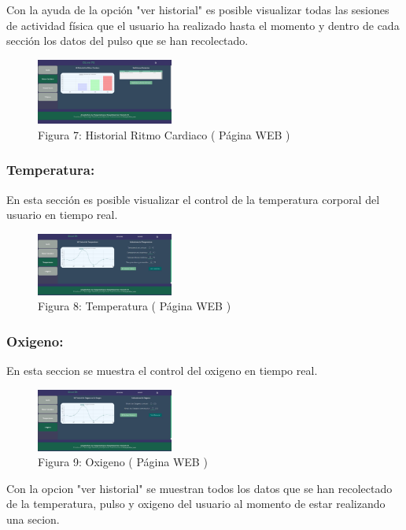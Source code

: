\documentclass[osajnl,twocolumn,showpacs,superscriptaddress,10pt]{revtex4-1}
\begin{document}
    Con la ayuda de la opción "ver historial" es posible visualizar todas las sesiones de actividad física que el usuario ha realizado hasta el momento y dentro de cada sección los datos del pulso que se han recolectado.
    
\begin{figure} [H] \centering 
\caption{Figura 7: Historial Ritmo Cardiaco ( Página WEB )}
\includegraphics[width=0.4\textwidth]{RitmoCh.PNG}
\end{figure}

\subsubsection{Temperatura:}
    En esta sección es posible visualizar el control de la temperatura corporal del usuario en tiempo real.
    
\begin{figure} [H] \centering 
\caption{Figura 8: Temperatura ( Página WEB )}
\includegraphics[width=0.4\textwidth]{temp.jpg}
\end{figure}

\subsubsection{Oxigeno:}
    En esta seccion se muestra el control del oxigeno en tiempo real.
    
\begin{figure} [H] \centering 
\caption{Figura 9: Oxigeno ( Página WEB )}
\includegraphics[width=0.4\textwidth]{oxig.jpg}
\end{figure}


    Con la opcion "ver historial" se muestran todos los datos que se han recolectado de la temperatura, pulso y oxigeno del usuario al momento de estar realizando una secion.
    
\end{document}
